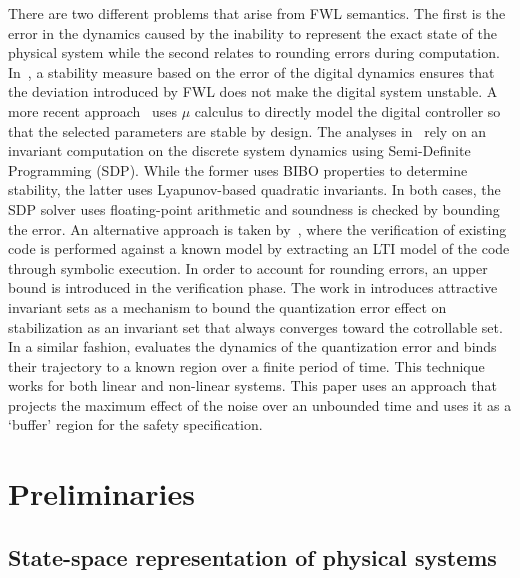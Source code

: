 \documentclass[runningheads,a4paper]{llncs}
\newcommand{\todo}[1]{{\color{red} TODO: #1}}
\begin{document}
There are two different problems that arise from FWL semantics.  The first
is the error in the dynamics caused by the inability to represent the exact
state of the physical system while the second relates to rounding errors
during computation.  In~\cite{fialho1994stability}, a stability measure
based on the error of the digital dynamics ensures that the deviation
introduced by FWL does not make the digital system unstable.  A more recent
approach~\cite{DBLP:journals/automatica/WuLCC09} uses $\mu$ calculus to
directly model the digital controller so that the selected parameters are
stable by design.  The analyses
in~\cite{DBLP:conf/hybrid/WangGRJF16,DBLP:conf/hybrid/RouxJG15} rely on an
invariant computation on the discrete system dynamics using Semi-Definite
Programming (SDP).  While the former uses BIBO properties to determine
stability, the latter uses Lyapunov-based quadratic invariants.  In both
cases, the SDP solver uses floating-point arithmetic and soundness is
checked by bounding the error.  An alternative approach is taken
by~\cite{park2016scalable}, where the verification of existing code is
performed against a known model by extracting an LTI model of the code
through symbolic execution.  In order to account for rounding errors, an
upper bound is introduced in the verification phase.
The work in \cite{picasso2002construction,picasso2003stabilization} introduces
attractive invariant sets as a mechanism to bound the quantization error effect
on stabilization as an invariant set that always converges toward the cotrollable
set. In a similar fashion, \cite{liberzon2003hybrid} evaluates the dynamics of the
quantization error and binds their trajectory to a known region over a finite
period of time. This technique works for both linear and non-linear systems.
This paper uses an approach that projects the maximum effect of the noise over
an unbounded time and uses it as a `buffer' region for the safety specification.


\section{Preliminaries}
\label{sec:preliminaries}

\subsection{State-space representation of physical systems} 
\label{ssec:ssrepresentation}
\end{document}
